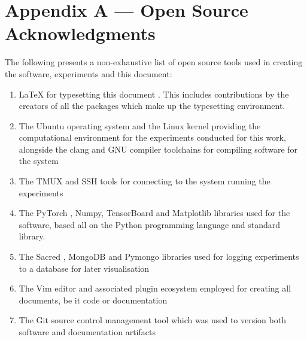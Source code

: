 \chapter{Appendix A --- Open Source Acknowledgments}

The following presents a non-exhaustive list of open source tools used in
creating the software, experiments and this document:
\begin{enumerate}
    \item \LaTeX{} for typesetting this document \citep{lamport}. This includes contributions by
        the creators of all the packages which make up the typesetting
        environment.
    \item The Ubuntu operating system and the Linux kernel
        \citep{torvalds2008linux} providing the
        computational environment for the experiments conducted for this work,
        alongside the clang \citep{lattnerLLVM} and GNU compiler toolchains for compiling software
        for the system
    \item The TMUX and SSH tools for connecting to the system running the
        experiments
    \item The PyTorch \citep{paszke2017automatic}, Numpy, TensorBoard and
        Matplotlib libraries \citep{scipy} used for the
        software, based all on the Python programming language and standard
        library.
    \item The Sacred \citep{sacred}, MongoDB and Pymongo libraries used for logging experiments
        to a database for later visualisation
    \item The Vim editor and associated plugin ecosystem employed for creating
        all documents, be it code or documentation
    \item The Git source control management tool which was used to version both
        software and documentation artifacts
\end{enumerate}
